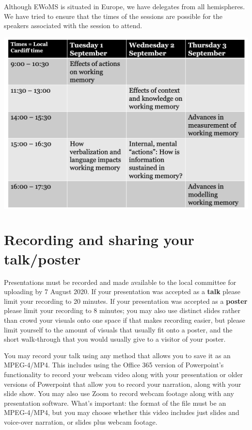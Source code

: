\documentclass[
  12pt,
]{book}
\begin{document}
Although EWoMS is situated in Europe, we have delegates from all hemispheres. We have tried to ensure that the times of the sessions are possible for the speakers associated with the session to attend.

\includegraphics{ewomsSched.png}

\hypertarget{recording-and-sharing-your-talkposter}{%
\section{Recording and sharing your talk/poster}\label{recording-and-sharing-your-talkposter}}

Presentations must be recorded and made available to the local committee for uploading by 7 August 2020. If your presentation was accepted as a \textbf{talk} please limit your recording to 20 minutes. If your presentation was accepted as a \textbf{poster} please limit your recording to 8 minutes; you may also use distinct slides rather than crowd your visuals onto one space if that makes recording easier, but please limit yourself to the amount of visuals that usually fit onto a poster, and the short walk-through that you would usually give to a visitor of your poster.

You may record your talk using any method that allows you to save it as an MPEG-4/MP4. This includes using the Office 365 version of Powerpoint's functionality to record your webcam video along with your presentation or older versions of Powerpoint that allow you to record your narration, along with your slide show. You may also use Zoom to record webcam footage along with any presentation software. What's important: the format of the file must be an MPEG-4/MP4, but you may choose whether this video includes just slides and voice-over narration, or slides plus webcam footage.
\end{document}
